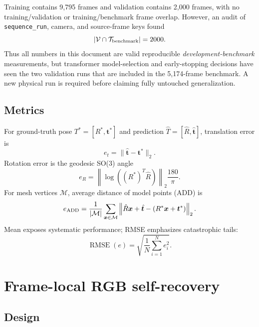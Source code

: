 \documentclass[11pt]{article}
\begin{document}
Training contains 9,795 frames and validation contains 2,000 frames, with no training/validation or training/benchmark frame overlap.  However, an audit of \texttt{sequence\_run}, camera, and source-frame keys found
\[
|\mathcal V\cap\mathcal T_{\rm benchmark}|=2000.
\]
Thus all numbers in this document are valid reproducible \emph{development-benchmark} measurements, but transformer model-selection and early-stopping decisions have seen the two validation runs that are included in the 5,174-frame benchmark.  A new physical run is required before claiming fully untouched generalization.

\subsection{Metrics}

For ground-truth pose $T^*=[R^*,\bm t^*]$ and prediction $\hat T=[\hat R,\hat{\bm t}]$, translation error is
\begin{equation}
e_t=\|\hat{\bm t}-\bm t^*\|_2.
\end{equation}
Rotation error is the geodesic SO(3) angle
\begin{equation}
e_R=\left\|\log\!\left((R^*)^T\hat R\right)\right\|_2\frac{180}{\pi}.
\end{equation}
For mesh vertices $\mathcal M$, average distance of model points (ADD) is
\begin{equation}
e_{\rm ADD}=\frac{1}{|\mathcal M|}\sum_{\bm x\in\mathcal M}
\left\|\hat R\bm x+\hat{\bm t}-(R^*\bm x+\bm t^*)\right\|_2.
\end{equation}
Mean exposes systematic performance; RMSE emphasizes catastrophic tails:
\begin{equation}
\operatorname{RMSE}(e)=\sqrt{\frac{1}{N}\sum_{i=1}^{N}e_i^2}.
\end{equation}

\section{Frame-local RGB self-recovery}

\subsection{Design}
\end{document}

